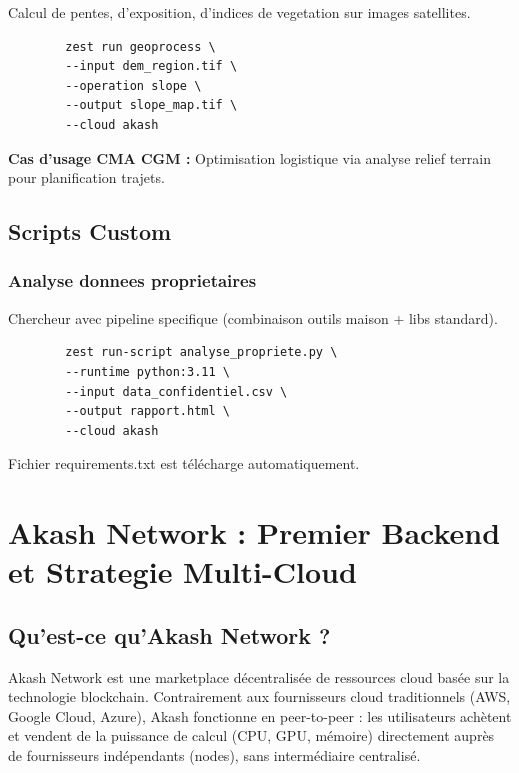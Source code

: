 \documentclass[11pt,a4paper]{article}
\begin{document}
	Calcul de pentes, d'exposition, d'indices de vegetation sur images satellites.
	
	\begin{lstlisting}
		zest run geoprocess \
		--input dem_region.tif \
		--operation slope \
		--output slope_map.tif \
		--cloud akash
	\end{lstlisting}
	
	\textbf{Cas d'usage CMA CGM :} Optimisation logistique via analyse relief terrain pour planification trajets.
	
	\subsection{Scripts Custom}
	
	\subsubsection{Analyse donnees proprietaires}
	
	Chercheur avec pipeline specifique (combinaison outils maison + libs standard).
	
	\begin{lstlisting}
		zest run-script analyse_propriete.py \
		--runtime python:3.11 \
		--input data_confidentiel.csv \
		--output rapport.html \
		--cloud akash
	\end{lstlisting}
	
	Fichier requirements.txt est télécharge automatiquement.
	
	\newpage
	
	\section{Akash Network : Premier Backend et Strategie Multi-Cloud}
	
	\subsection{Qu'est-ce qu'Akash Network ?}
	
	Akash Network est une marketplace décentralisée de ressources cloud basée sur la technologie blockchain. Contrairement aux fournisseurs cloud traditionnels (AWS, Google Cloud, Azure), Akash fonctionne en peer-to-peer : les utilisateurs achètent et vendent de la puissance de calcul (CPU, GPU, mémoire) directement auprès de fournisseurs indépendants (nodes), sans intermédiaire centralisé.
	
\end{document}
